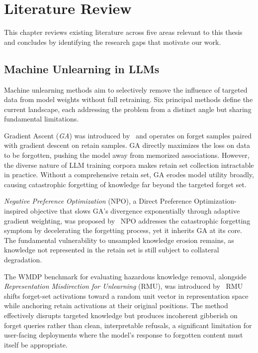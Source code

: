 \chapter{Literature Review}
\label{chap:lit_review}


This chapter reviews existing literature across five areas relevant to this thesis and concludes by identifying the research gaps that motivate our work.


\section{Machine Unlearning in LLMs}

Machine unlearning methods aim to selectively remove the influence of targeted data from model weights without full retraining. Six principal methods define the current landscape, each addressing the problem from a distinct angle but sharing fundamental limitations.



Gradient Ascent (\emph{GA}) was introduced by~\citeauthor{yao2024large} and operates on forget samples paired with gradient descent on retain samples. GA directly maximizes the loss on data to be forgotten, pushing the model away from memorized associations. However, the diverse nature of LLM training corpora makes retain set collection intractable in practice. Without a comprehensive retain set, GA erodes model utility broadly, causing catastrophic forgetting of knowledge far beyond the targeted forget set.

\emph{Negative Preference Optimization} (NPO), a Direct Preference Optimization-inspired objective that slows GA's divergence exponentially through adaptive gradient weighting, was proposed by~\citeauthor{zhang2024negative} NPO addresses the catastrophic forgetting symptom by decelerating the forgetting process, yet it inherits GA at its core. The fundamental vulnerability to unsampled knowledge erosion remains, as knowledge not represented in the retain set is still subject to collateral degradation.

The WMDP benchmark for evaluating hazardous knowledge removal, alongside \emph{Representation Misdirection for Unlearning} (RMU), was introduced by~\citeauthor{li2024wmdp} RMU shifts forget-set activations toward a random unit vector in representation space while anchoring retain activations at their original positions. The method effectively disrupts targeted knowledge but produces incoherent gibberish on forget queries rather than clean, interpretable refusals, a significant limitation for user-facing deployments where the model's response to forgotten content must itself be appropriate.

